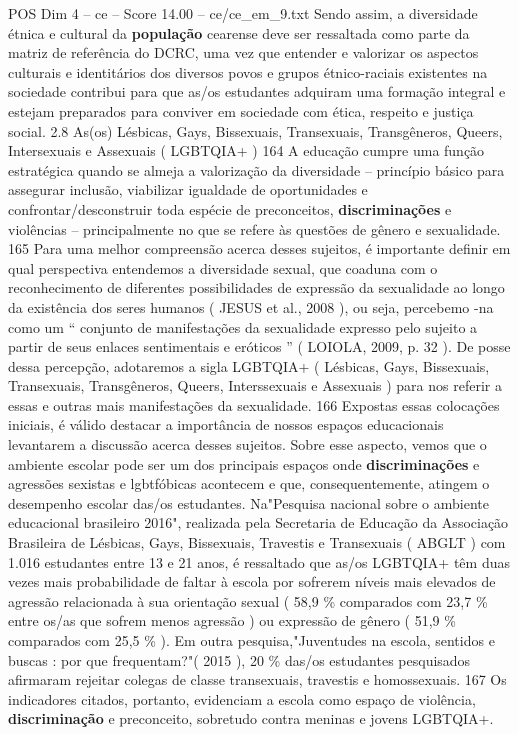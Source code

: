 \begin{textsample}{POS Dim 4 – ce – Score 14.00 – ce/ce\_em\_9.txt}
Sendo assim, a diversidade étnica e cultural da \textbf{população} cearense deve ser ressaltada como parte da matriz de referência do DCRC, uma vez que entender e valorizar os aspectos culturais e identitários dos diversos povos e grupos étnico-raciais existentes na sociedade contribui para que as/os estudantes adquiram uma formação integral e estejam preparados para conviver em sociedade com ética, respeito e justiça social. 2.8 As(os) Lésbicas, Gays, Bissexuais, Transexuais, Transgêneros, Queers, Intersexuais e Assexuais ( LGBTQIA+ ) 164 A educação cumpre uma função estratégica quando se almeja a valorização da diversidade – princípio básico para assegurar inclusão, viabilizar igualdade de oportunidades e confrontar/desconstruir toda espécie de preconceitos, \textbf{discriminações} e violências – principalmente no que se refere às questões de gênero e sexualidade. 165 Para uma melhor compreensão acerca desses sujeitos, é importante definir em qual perspectiva entendemos a diversidade sexual, que coaduna com o reconhecimento de diferentes possibilidades de expressão da sexualidade ao longo da existência dos seres humanos ( JESUS et al., 2008 ), ou seja, percebemo -na como um “ conjunto de manifestações da sexualidade expresso pelo sujeito a partir de seus enlaces sentimentais e eróticos ” ( LOIOLA, 2009, p. 32 ).
De posse dessa percepção, adotaremos a sigla LGBTQIA+ ( Lésbicas, Gays, Bissexuais, Transexuais, Transgêneros, Queers, Interssexuais e Assexuais ) para nos referir a essas e outras mais manifestações da sexualidade. 166 Expostas essas colocações iniciais, é válido destacar a importância de nossos espaços educacionais levantarem a discussão acerca desses sujeitos.
Sobre esse aspecto, vemos que o ambiente escolar pode ser um dos principais espaços onde \textbf{discriminações} e agressões sexistas e lgbtfóbicas acontecem e que, consequentemente, atingem o desempenho escolar das/os estudantes.
Na"Pesquisa nacional sobre o ambiente educacional brasileiro 2016", realizada pela Secretaria de Educação da Associação Brasileira de Lésbicas, Gays, Bissexuais, Travestis e Transexuais ( ABGLT ) com 1.016 estudantes entre 13 e 21 anos, é ressaltado que as/os LGBTQIA+ têm duas vezes mais probabilidade de faltar à escola por sofrerem níveis mais elevados de agressão relacionada à sua orientação sexual ( 58,9 \% comparados com 23,7 \% entre os/as que sofrem menos agressão ) ou expressão de gênero ( 51,9 \% comparados com 25,5 \% ).
Em outra pesquisa,"Juventudes na escola, sentidos e buscas : por que frequentam?"( 2015 ), 20 \% das/os estudantes pesquisados afirmaram rejeitar colegas de classe transexuais, travestis e homossexuais. 167 Os indicadores citados, portanto, evidenciam a escola como espaço de violência, \textbf{discriminação} e preconceito, sobretudo contra meninas e jovens LGBTQIA+.

\end{textsample}
